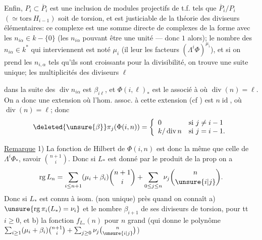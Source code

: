 Enfin, $P_i\subset\overline P_i$ est une inclusion de
modules projectifs de t.f. tels que
$\overline P_i/P_i$ $(\simeq\mathrm{tors}\ H_{i-1})$ soit de torsion,
et est justiciable de la théorie des
diviseurs élémentaires: 
ce complexe est une somme directe
de complexes de la forme
avec les $n_{i\alpha}\in k-\{0\}$ (les $n_{i\alpha}$ pouvant être
une unité --- donc $1$ alors); le
nombre des $n_{i\alpha}\in k^*$ qui interviennent
est noté $\mu_i$ (il leur 
les facteurs $(\Lambda^i\Phi)^{\mu_i}$), et si on
prend les  $n_{i,\alpha}$ tels qu'ils sont croissants
pour la divisibilité, on trouve une suite
unique; les multiplicités  des diviseurs $\ell$

dans la suite des $\operatorname{div}n_{i\alpha}$ est $\beta_{i\ell}$,
et $\Phi(i,\ell)_*$ est le 
 associé
à
où $\operatorname{div}(n)=\ell$. On a donc
une extension
où l'hom. assoc. à cette extension
(cf \unsure{\ldots}) est $n\operatorname{id}$, où $\operatorname{div}(n)=\ell$;
donc
\[
\deleted{\unsure{\beta}}\pi_j(\Phi(i,n))=
\left\{\begin{array}{ll}0&\text{si }j\neq i-1\\
k/\operatorname{div}n&\text{si }j=i-1.
\end{array}\right.
\]

\uline{Remarque} 1) La fonction de Hilbert de $\Phi(i,n)$
est donc la même que celle de $\Lambda^i\Phi_*$,
savoir $\binom{n+1}{i}$. Donc si $L_*$ est
donné par le produit de la prop on a
\[
\operatorname{rg}L_n=\sum_{i\leq n+1}(\mu_i+\beta_i)\binom{n+1}{i}
+\sum_{0\leq j\leq n}\nu_j\binom{n}{\unsure{i|j}}.
\]
Donc si $L_*$ est 
connu à isom. (non unique)
près quand on connaît a) $\unsure{\operatorname{rg}\pi_i(L_*)=\nu_i}$
et le nombre $\beta_{i+1}$ de ses diviseurs de
torsion, pour tt $i\geq0$, et b) la fonction
$f_{L_*}(n)$ pour $n$ grand (qui donne
  le polynôme
$\sum_{i\geq1}(\mu_i+\beta_i)\binom{n+1}{i}
+\sum_{j\geq0}\nu_j\binom{n}{\unsure{i|j}}$)

